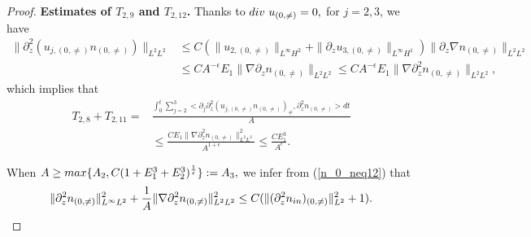 \documentclass[12pt, reqno]{amsart}
\numberwithin{equation}{section}
\begin{document}
\begin{proof}
		{\bf Estimates of $T_{2,9}$ and $T_{2,12}$.} 
		Thanks to ${\rm div}~u_{(0,\neq)}=0,$ for $j=2,3$, we have 
		\begin{equation*}
			\begin{aligned}
				\|\partial_z^2(u_{j,(0,\neq)}n_{(0,\neq)})\|_{L^2L^2}&\leq
				C(\|u_{2,(0,\neq)}\|_{L^{\infty}H^2}+\|\partial_zu_{3,(0,\neq)}\|_{L^{\infty}H^1})
				\|\partial_z\nabla n_{(0,\neq)}\|_{L^2L^{2}}\\
				&\leq CA^{-\epsilon}E_1\|\nabla \partial_z n_{(0,\neq)}\|_{L^2L^{2}}
				\leq CA^{-\epsilon}E_1\|\nabla \partial_z^2 n_{(0,\neq)}\|_{L^2L^{2}},
			\end{aligned}
		\end{equation*}
		which implies   that 
		\begin{equation*}
			\begin{aligned}	
				T_{2,8}+T_{2,11}=&\frac{\int_{0}^t\sum_{j=2}^3
					<\partial_j\partial_z^2(u_{j,(0,\neq)}n_{(0,\neq)})_{\neq},
					\partial_z^2n_{(0,\neq)}>dt}{A}\\
				&\leq \frac{CE_1\|\nabla \partial_z^2 n_{(0,\neq)}\|_{L^2L^{2}}^2}{A^{1+\epsilon}}
				\leq \frac{CE_1^3}{A^{\epsilon}}.
			\end{aligned}
		\end{equation*}
		
		When
		$A\geq{\rm max}\{A_2,
		C(1+E_1^3+E_2^3)^{\frac{1}{\epsilon}}\}:=A_3,$ 
		we infer from (\ref{n_0_neq12}) that
		\begin{equation*}
			\begin{aligned}
				\|\partial_{z}^2n_{(0,\neq)}\|^2_{L^{\infty}L^2}+
				\frac{1}{A}\|\nabla \partial_{z}^2n_{(0,\neq)}\|_{L^2L^2}^2\leq C(\|(\partial_z^2n_{\rm in})_{(0,\neq)}\|_{L^2}^2
				+1).
			\end{aligned}
		\end{equation*}
	\end{proof}
	
\end{document}
